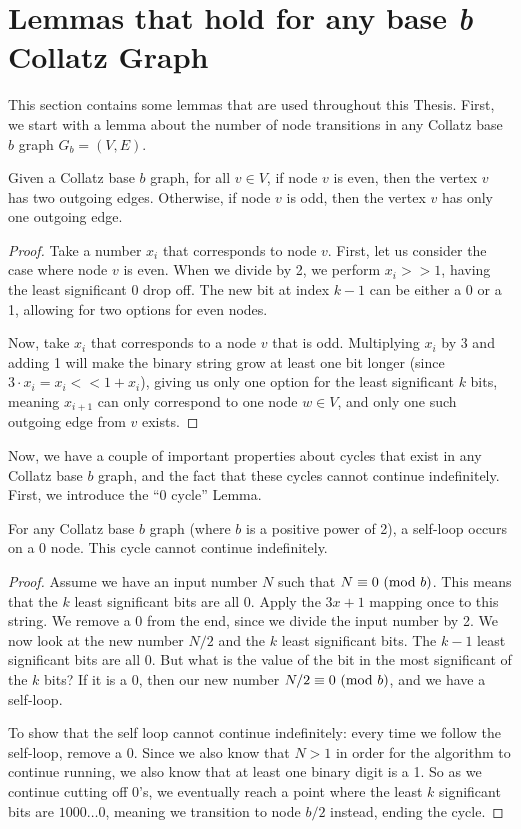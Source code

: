 \section{Lemmas that hold for any base \textit{b} Collatz Graph}
This section contains some lemmas that are used throughout this Thesis. First, we start with a lemma about the number of node transitions in any Collatz base $b$ graph $G_b= (V,E)$.
\begin{lemma}
\label{lem:numOutEdges}
Given a Collatz base $b$ graph, for all $v \in V$, if node $v$ is even, then the vertex $v$ has two outgoing edges. Otherwise, if node $v$ is odd, then the vertex $v$ has only one outgoing edge.
\end{lemma}
\begin{proof}
Take a number $x_i$ that corresponds to node $v$. First, let us consider the case where node $v$ is even. When we divide by 2, we perform $x_i >> 1$, having the least significant 0 drop off. The new bit at index $k-1$ can be either a 0 or a 1, allowing for two options for even nodes. \par
Now, take $x_i$ that corresponds to a node $v$ that is odd. Multiplying $x_i$ by 3 and adding 1 will make the binary string grow at least one bit longer (since $3\cdot x_i = x_i << 1 + x_i$), giving us only one option for the least significant $k$ bits, meaning $x_{i+1}$ can only correspond to one node $w \in V$, and only one such outgoing edge from $v$ exists.
\end{proof}
Now, we have a couple of important properties about cycles that exist in any Collatz base $b$ graph, and the fact that these cycles cannot continue indefinitely. First, we introduce the ``0 cycle'' Lemma.
\begin{lemma}
\label{lem:zeroCycle}
For any Collatz base $b$ graph (where $b$ is a positive power of 2), a self-loop occurs on a 0 node. This cycle cannot continue indefinitely.
\end{lemma}
\begin{proof}
Assume we have an input number $N$ such that $N \equiv 0 \ (\mathrm{mod}\ b)$. This means that the $k$ least significant bits are all 0. Apply the $3x+1$ mapping once to this string. We remove a 0 from the end, since we divide the input number by 2. We now look at the new number $N/2$ and the $k$ least significant bits. The $k-1$ least significant bits are all 0. But what is the value of the bit in the most significant of the $k$ bits? If it is a 0, then our new number $N/2 \equiv 0 \ (\mathrm{mod}\ b)$, and we have a self-loop. \par
To show that the self loop cannot continue indefinitely: every time we follow the self-loop, remove a 0. Since we also know that $N > 1$ in order for the algorithm to continue running, we also know that at least one binary digit is a 1. So as we continue cutting off 0's, we eventually reach a point where the least $k$ significant bits are $1000\ldots 0$, meaning we transition to node $b/2$ instead, ending the cycle.
\end{proof}
